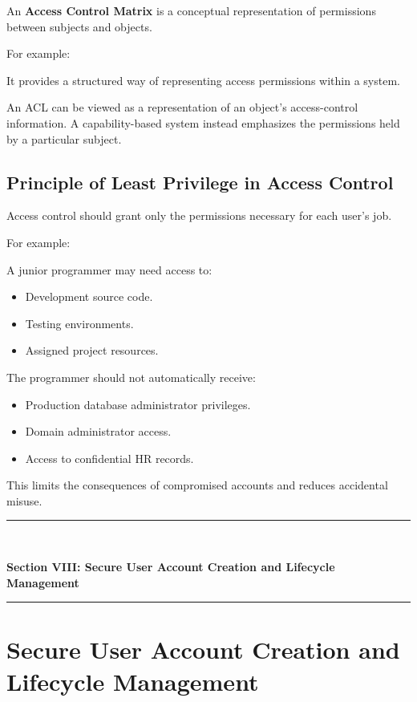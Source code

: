 An \textbf{Access Control Matrix} is a conceptual representation of permissions between subjects and objects.

For example:


It provides a structured way of representing access permissions within a system.

An ACL can be viewed as a representation of an object's access-control information. A capability-based system instead emphasizes the permissions held by a particular subject.

\subsection{Principle of Least Privilege in Access Control}

Access control should grant only the permissions necessary for each user's job.

For example:

A junior programmer may need access to:

\begin{itemize}
\item Development source code.
\item Testing environments.
\item Assigned project resources.
\end{itemize}

The programmer should not automatically receive:

\begin{itemize}
\item Production database administrator privileges.
\item Domain administrator access.
\item Access to confidential HR records.
\end{itemize}

This limits the consequences of compromised accounts and reduces accidental misuse.


\newpage
\begin{center}
\vspace{0.5em}
{\color{primary}\rule{0.45\textwidth}{1.2pt}\\[4pt]}
{\Large\bfseries\color{primary} Section VIII: Secure User Account Creation and Lifecycle Management\\[2pt]}
{\color{primary}\rule{0.45\textwidth}{1.2pt}}
\vspace{0.5em}
\end{center}

\section{Secure User Account Creation and Lifecycle Management}


